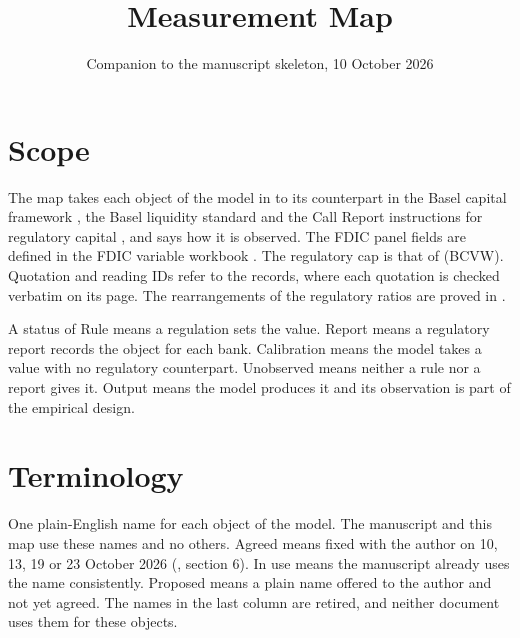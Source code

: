 \documentclass[11pt]{article}
\title{Measurement Map}
\author{}
\date{Companion to the manuscript skeleton, 10 October 2026}
\begin{document}
\maketitle

\section{Scope}

The map takes each object of the model in  to its
counterpart in the Basel capital framework \citep{bcbs2011}, the Basel
liquidity standard \citep{bcbs2013} and the Call Report instructions for
regulatory capital \citep{ffiec2026}, and says how it is observed. The
FDIC panel fields are defined in the FDIC variable workbook \citep{fdic2026}. The
regulatory cap is that of \citet{bayraktar2026} (BCVW). Quotation and
reading IDs refer to the  records, where each quotation is checked
verbatim on its page. The rearrangements of the regulatory ratios are proved
in .

A status of Rule means a regulation sets the value. Report means a
regulatory report records the object for each bank. Calibration means the
model takes a value with no regulatory counterpart. Unobserved means
neither a rule nor a report gives it. Output means the model produces it
and its observation is part of the empirical design.

\section{Terminology}

One plain-English name for each object of the model. The manuscript and
this map use these names and no others. Agreed means fixed with the author
on 10, 13, 19 or 23 October 2026 (, section 6). In
use means the manuscript already uses the name consistently. Proposed means a
plain name offered to the author and not yet agreed. The names in the last
column are retired, and neither document uses them for these objects.
\end{document}
